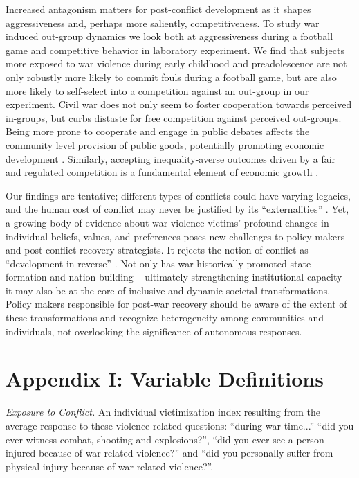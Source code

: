 Increased antagonism matters for post-conflict development as it shapes aggressiveness and, perhaps more saliently, competitiveness. To study war induced out-group dynamics we look both at aggressiveness during a football game and competitive behavior in laboratory experiment. We find that subjects more exposed to war violence during early childhood and preadolescence are not only robustly more likely to commit fouls during a football game, but are also more likely to self-select into a competition against an out-group in our experiment. Civil war does not only seem to foster cooperation towards perceived in-groups, but curbs distaste for free competition against perceived out-groups. Being more prone to cooperate and engage in public debates affects the community level provision of public goods, potentially promoting economic development \citep{Bellows2009b}. Similarly, accepting inequality-averse outcomes driven by a fair and regulated competition is a fundamental element of economic growth \citep{Bartling2009b}.
 
Our findings are tentative; different types of conflicts could have varying legacies, and the human cost of conflict may never be justified by its ``externalities'' \citep{CassarAlessandra}. Yet, a growing body of evidence about war violence victims’ profound changes in individual beliefs, values, and preferences poses new challenges to policy makers and post-conflict recovery strategists. It rejects the notion of conflict as ``development in reverse'' \cite{Collier2003}. Not only has war historically promoted state formation and nation building – ultimately strengthening institutional capacity \citep{Tilly1975} -- it may also be at the core of inclusive and dynamic societal transformations. Policy makers responsible for post-war recovery should be aware of the extent of these transformations and recognize heterogeneity among communities and individuals, not overlooking the significance of autonomous responses.




\clearpage 






\clearpage
\section*{Appendix I: Variable Definitions}

\textit{Exposure to Conflict.} An individual victimization index resulting from the average response to these violence related questions: ``during war time...'' ``did you ever witness combat, shooting and explosions?'', ``did you ever see a person injured because of war-related violence?'' and ``did you personally suffer from physical injury because of war-related violence?''.

